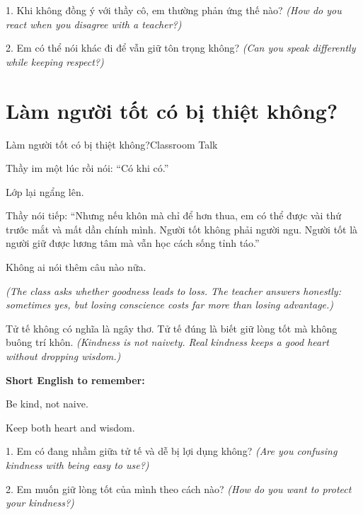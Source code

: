 \begin{tuhocnhanh}
1. Khi không đồng ý với thầy cô, em thường phản ứng thế nào? \textit{(How do you react when you disagree with a teacher?)}

2. Em có thể nói khác đi để vẫn giữ tôn trọng không? \textit{(Can you speak differently while keeping respect?)}
\end{tuhocnhanh}
\ngancach

\section{Làm người tốt có bị thiệt không?}
\begin{truyen}{Làm người tốt có bị thiệt không?}{Classroom Talk}

Thầy im một lúc rồi nói: ``Có khi có.''

Lớp lại ngẩng lên.

Thầy nói tiếp: ``Nhưng nếu khôn mà chỉ để hơn thua, em có thể được vài thứ trước mắt và mất dần chính mình. Người tốt không phải người ngu. Người tốt là người giữ được lương tâm mà vẫn học cách sống tỉnh táo.''

Không ai nói thêm câu nào nữa.

\textit{(The class asks whether goodness leads to loss. The teacher answers honestly: sometimes yes, but losing conscience costs far more than losing advantage.)}
\end{truyen}

\begin{baihoc}
Tử tế không có nghĩa là ngây thơ. Tử tế đúng là biết giữ lòng tốt mà không buông trí khôn.
\textit{(Kindness is not naivety. Real kindness keeps a good heart without dropping wisdom.)}
\end{baihoc}

\begin{ghinhoanh}
\textbf{Short English to remember:}

Be kind, not naive.

Keep both heart and wisdom.
\end{ghinhoanh}

\begin{tuhocnhanh}
1. Em có đang nhầm giữa tử tế và dễ bị lợi dụng không? \textit{(Are you confusing kindness with being easy to use?)}

2. Em muốn giữ lòng tốt của mình theo cách nào? \textit{(How do you want to protect your kindness?)}
\end{tuhocnhanh}
\ngancach

